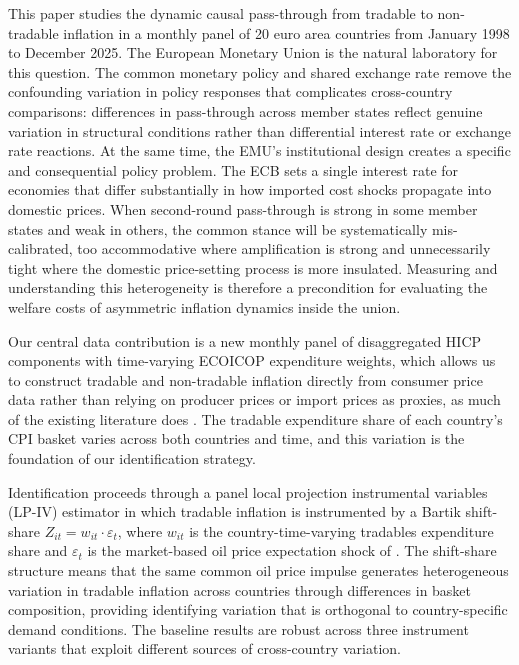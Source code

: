 \documentclass[a4paper,12pt]{article}
\begin{document}
This paper studies the dynamic causal pass-through from tradable to non-tradable inflation in a monthly panel of 20 euro area countries from January 1998 to December 2025. The European Monetary Union is the natural laboratory for this question. The common monetary policy and shared exchange rate remove the confounding variation in policy responses that complicates cross-country comparisons: differences in pass-through across member states reflect genuine variation in structural conditions rather than differential interest rate or exchange rate reactions. At the same time, the EMU's institutional design creates a specific and consequential policy problem. The ECB sets a single interest rate for economies that differ substantially in how imported cost shocks propagate into domestic prices. When second-round pass-through is strong in some member states and weak in others, the common stance will be systematically mis-calibrated, too accommodative where amplification is strong and unnecessarily tight where the domestic price-setting process is more insulated. Measuring and understanding this heterogeneity is therefore a precondition for evaluating the welfare costs of asymmetric inflation dynamics inside the union.

Our central data contribution is a new monthly panel of disaggregated HICP components with time-varying ECOICOP expenditure weights, which allows us to construct tradable and non-tradable inflation directly from consumer price data rather than relying on producer prices or import prices as proxies, as much of the existing literature does . The tradable expenditure share of each country's CPI basket varies across both countries and time, and this variation is the foundation of our identification strategy.

Identification proceeds through a panel local projection instrumental variables (LP-IV) estimator in which tradable inflation is instrumented by a Bartik shift-share $Z_{it} = w_{it} \cdot \varepsilon_t$, where $w_{it}$ is the country-time-varying tradables expenditure share and $\varepsilon_t$ is the market-based oil price expectation shock of . The shift-share structure means that the same common oil price impulse generates heterogeneous variation in tradable inflation across countries through differences in basket composition, providing identifying variation that is orthogonal to country-specific demand conditions. The baseline results are robust across three instrument variants that exploit different sources of cross-country variation.
\end{document}
